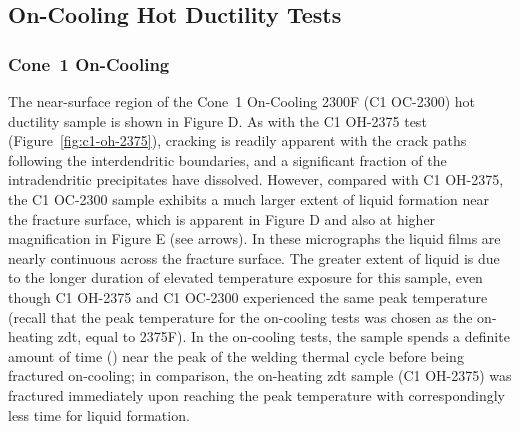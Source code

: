 
\subsection{On-Cooling Hot Ductility Tests}
\subsubsection{Cone~1 On-Cooling}
The near-surface region of the Cone~1 On-Cooling 2300F (C1 OC-2300) hot ductility sample is shown in Figure D. As with the C1 OH-2375 test (Figure~\ref{fig:c1-oh-2375}), cracking is readily apparent with the crack paths following the interdendritic boundaries, and a significant fraction of the intradendritic precipitates have dissolved. However, compared with C1 OH-2375, the C1 OC-2300 sample exhibits a much larger extent of liquid formation near the fracture surface, which is apparent in Figure D and also at higher magnification in Figure E (see arrows). In these micrographs the liquid films are nearly continuous across the fracture surface. The greater extent of liquid is due to the longer duration of elevated temperature exposure for this sample, even though C1 OH-2375 and C1 OC-2300 experienced the same peak temperature (recall that the peak temperature for the on-cooling tests was chosen as the on-heating \gls{zdt}, equal to 2375\textdegree{}F). In the on-cooling tests, the sample spends a definite amount of time () near the peak of the welding thermal cycle before being fractured on-cooling; in comparison, the on-heating \gls{zdt} sample (C1 OH-2375) was fractured immediately upon reaching the peak temperature with correspondingly less time for liquid formation.

